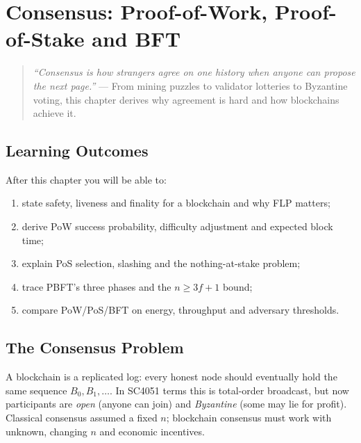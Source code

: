 \chapter{Consensus: Proof-of-Work, Proof-of-Stake and BFT}\label{ch:consensus}

\begin{quote}
\emph{``Consensus is how strangers agree on one history when anyone can propose the next page.''} --- From mining puzzles to validator lotteries to Byzantine voting, this chapter derives why agreement is hard and how blockchains achieve it.
\end{quote}

\noindent{}
\vspace{0.4em}

\section*{Learning Outcomes}
After this chapter you will be able to:
\begin{enumerate}[label=(L\arabic*)]
    \item state safety, liveness and finality for a blockchain and why FLP matters;
    \item derive PoW success probability, difficulty adjustment and expected block time;
    \item explain PoS selection, slashing and the nothing-at-stake problem;
    \item trace PBFT's three phases and the $n\ge 3f+1$ bound;
    \item compare PoW/PoS/BFT on energy, throughput and adversary thresholds.
\end{enumerate}

\section{The Consensus Problem}\label{sec:consensus-problem}
A blockchain is a replicated log: every honest node should eventually hold the same sequence $B_0,B_1,\dots$. In SC4051 terms this is total-order broadcast, but now participants are \emph{open} (anyone can join) and \emph{Byzantine} (some may lie for profit). Classical consensus assumed a fixed $n$; blockchain consensus must work with unknown, changing $n$ and economic incentives.

